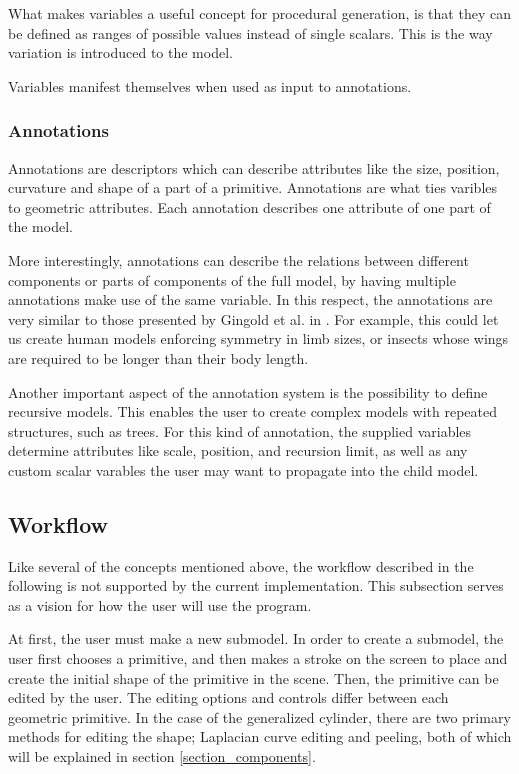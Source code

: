 \documentclass[english]{article}
\begin{document}
What makes variables a useful concept for procedural generation, is that they can be defined as ranges of possible values instead of single scalars. This is the way variation is introduced to the model.

Variables manifest themselves when used as input to annotations. 


\subsubsection{Annotations}

Annotations are descriptors  which can describe attributes like the size, position, curvature and shape of a part of a primitive. Annotations are what ties varibles to geometric attributes. Each annotation describes one attribute of one part of the model.

More interestingly, annotations can describe the relations between different components or parts of components of the full model, by having multiple annotations make use of the same variable. In this respect, the annotations are very similar to those presented by Gingold et al. in \cite{gingold09}. For example, this could let us create human models enforcing symmetry in limb sizes, or insects whose wings are required to be longer than their body length.

Another important aspect of the annotation system is the possibility to define recursive models. This enables the user to create complex models with repeated structures, such as trees. For this kind of annotation, the supplied variables determine attributes like scale, position, and recursion limit, as well as any custom scalar varables the user may want to propagate into the child model.


\subsection{Workflow}

Like several of the concepts mentioned above, the workflow described in the following is not supported by the current implementation. This subsection serves as a vision for how the user will use the program.

At first, the user must make a new submodel.
In order to create a submodel, the user first chooses a primitive, and then makes a stroke on the screen to place and create the initial shape of the primitive in the scene. Then, the primitive can be edited by the user. The editing options and controls differ between each geometric primitive. In the case of the generalized cylinder, there are two primary methods for editing the shape; Laplacian curve editing and peeling, both of which will be explained in section \ref{section_components}.
\end{document}
